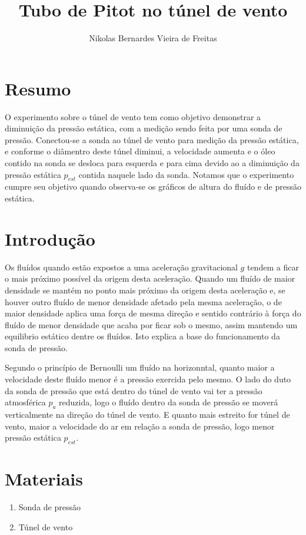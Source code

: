 \documentclass[a4paper]{article}
\title{Tubo de Pitot no túnel de vento}
\author{Nikolas Bernardes Vieira de Freitas}
\begin{document}
\maketitle

\section{Resumo}
    O experimento sobre o túnel de vento tem como objetivo demonstrar a diminuição da pressão estática, com a medição sendo feita por uma sonda de pressão. Conectou-se a sonda ao túnel de vento para medição da pressão estática, e conforme o diâmentro deste túnel diminui, a velocidade aumenta e o óleo contido na sonda se desloca para esquerda e para cima devido ao a diminuição da pressão estática $p_{est}$ contida naquele lado da sonda. Notamos que o experimento cumpre seu objetivo quando observa-se os gráficos de altura do fluído e de pressão estática.

\section{Introdução}
      Os fluídos quando estão expostos a uma aceleração gravitacional $g$ tendem a ficar o mais próximo possível da origem desta aceleração. Quando um fluído de maior densidade se mantém no ponto mais próximo da origem desta aceleração e, se houver outro fluído de menor densidade afetado pela mesma aceleração, o de maior densidade aplica uma força de mesma direção e sentido contrário à força do fluído de menor densidade que acaba por ficar sob o mesmo, assim mantendo um equilibrio estático dentre os fluídos. Isto explica a base do funcionamento da sonda de pressão.

     Segundo o princípio de Bernoulli um fluído na horizonntal, quanto maior a velocidade deste fluído menor é a pressão exercida pelo mesmo. O lado do duto da sonda de pressão que está dentro do túnel de vento vai ter a pressão atmosférica $p_a$ reduzida, logo o fluído dentro da sonda de pressão se moverá verticalmente na direção do túnel de vento. E quanto mais estreito for túnel de vento, maior a velocidade do ar em relação a sonda de pressão, logo menor pressão estática $p_{est}$.

\section{Materiais}
    \begin{enumerate}[label=(\roman*)]
        \item Sonda de pressão
        \item Túnel de vento
    \end{enumerate}
\end{document}
